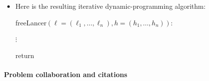 \begin{itemize}

\item[(g)]  Here is the resulting iterative dynamic-programming algorithm:

  \begin{myframed}
    \begin{steps}
    \ITEM[]
      \textsf{freeLancer}$(\ell=(\ell_1, \ldots, \ell_n), h=(h_1, \ldots, h_n))$:
      \begin{blue}
        
      \step \REPLACEME

      \step $\vdots$            %

      \step return \REPLACEME

      \end{blue}
    \end{steps}
  \end{myframed}



\end{itemize}

\vfill


\paragraph{Problem  collaboration and citations}~

